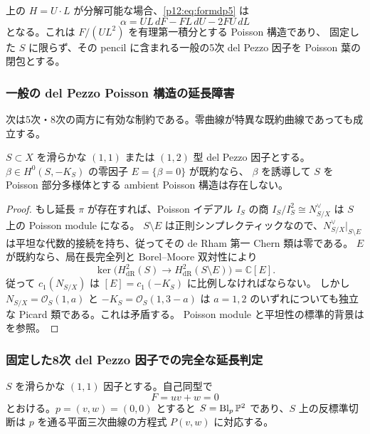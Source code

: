 \begin{remark}
上の $H=U\cdot L$ が分解可能な場合、\eqref{p12:eq:formdp5} は
\[
\alpha=UL\,dF-FL\,dU-2FU\,dL
\]
となる。これは $F/(UL^2)$ を有理第一積分とする Poisson 構造であり、
固定した $S$ に限らず、その pencil に含まれる一般の5次 del Pezzo 因子を Poisson 葉の閉包とする。
\end{remark}

\subsubsection{一般の del Pezzo Poisson 構造の延長障害}
次は5次・8次の両方に有効な制約である。零曲線が特異な既約曲線であっても成立する。
\begin{proposition}\label{p12:prop:flatobstruction}
$S\subset X$ を滑らかな $(1,1)$ または $(1,2)$ 型 del Pezzo 因子とする。
$\beta\in H^0(S,-K_S)$ の零因子 $E=\{\beta=0\}$ が既約なら、
$\beta$ を誘導して $S$ を Poisson 部分多様体とする ambient Poisson 構造は存在しない。
\end{proposition}
\begin{proof}
もし延長 $\pi$ が存在すれば、Poisson イデアル $I_S$ の商
$I_S/I_S^2\cong N_{S/X}^{\vee}$ は $S$ 上の Poisson module になる。
$S\setminus E$ は正則シンプレクティックなので、$N_{S/X}^{\vee}|_{S\setminus E}$
は平坦な代数的接続を持ち、従ってその de Rham 第一 Chern 類は零である。
$E$ が既約なら、局在長完全列と Borel--Moore 双対性により
\[
\ker\bigl(H^2_{\mathrm{dR}}(S)\to H^2_{\mathrm{dR}}(S\setminus E)\bigr)
=\mathbb C[E].
\]
従って $c_1(N_{S/X})$ は $[E]=c_1(-K_S)$ に比例しなければならない。
しかし $N_{S/X}=\mathcal O_S(1,a)$ と $-K_S=\mathcal O_S(1,3-a)$ は
$a=1,2$ のいずれについても独立な Picard 類である。これは矛盾する。
Poisson module と平坦性の標準的背景は\cite{p12-GualtieriPym,p12-Pym} を参照。
\end{proof}


\subsubsection{固定した8次 del Pezzo 因子での完全な延長判定}
$S$ を滑らかな $(1,1)$ 因子とする。自己同型で
\[
 F=uv+w=0
\]
とおける。$p=(v,w)=(0,0)$ とすると
$S=\operatorname{Bl}_{p}\mathbb P^2$ であり、$S$ 上の反標準切断は
$p$ を通る平面三次曲線の方程式 $P(v,w)$ に対応する。

